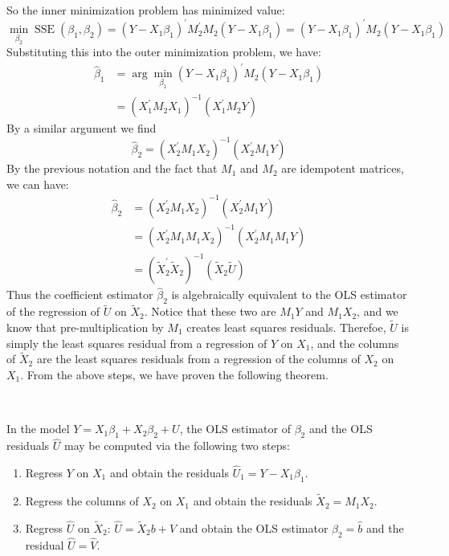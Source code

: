So the inner minimization problem has minimized value:
\[
\min_{\beta_2} \operatorname{SSE}(\beta_1, \beta_2)= (Y - X_1 \beta_1)^{\prime} M_2^{\prime} M_2 (Y - X_1 \beta_1) = (Y - X_1 \beta_1)^{\prime} M_2 (Y - X_1 \beta_1)
\]
Substituting this into the outer minimization problem, we have:
\begin{align*}
    \hat{\beta}_1 &= \arg \min_{\beta_1} (Y - X_1 \beta_1)^{\prime} M_2 (Y - X_1 \beta_1) \\
              &= \left( X_1^{\prime} M_2 X_1 \right)^{-1} \left( X_1^{\prime} M_2 Y \right)
\end{align*}
By a similar argument we find
\[
\hat{\beta}_2 = \left( X_2^{\prime} M_1 X_2 \right)^{-1} \left( X_2^{\prime} M_1 Y \right)
\]
By the previous notation and the fact that $M_1$ and $M_2$ are idempotent matrices, we can have:
\begin{align*}
    \hat{\beta}_2 &= \left( X_2^{\prime} M_1 X_2 \right)^{-1} \left( X_2^{\prime} M_1 Y \right) \\
              &= \left( X_2^{\prime} M_1 M_1 X_2 \right)^{-1}  \left( X_2^{\prime} M_1 M_1 Y \right) \\
              &= \left( \tilde{X}_2^{\prime} \tilde{X}_2 \right)^{-1} \left( \tilde{X}_2 \tilde{U} \right)
\end{align*}
Thus the coefficient estimator $\hat{\beta}_2$ is algebraically equivalent to the OLS estimator of the regression of $\tilde{U}$ on $\tilde{X}_2$.
Notice that these two are $M_1 Y$ and $M_1 X_2$, and we know that pre-multiplication by $M_1$ creates least squares residuals.
Therefoe, $\tilde{U}$ is simply the least squares residual from a regression of $Y$ on $X_1$,
and the columns of $\tilde{X}_2$ are the least squares residuals from a regression of the columns of $X_2$ on $X_1$.
From the above steps, we have proven the following theorem.

\begin{theorem}\label{thm:FWL}
    \

    In the model $Y = X_1 \beta_1 + X_2 \beta_2 + U$, the OLS estimator of $\beta_2$ and the OLS residuals $\hat{U}$ may be
    computed via the following two steps:
    \begin{enumerate}
        \item Regress $Y$ on $X_1$ and obtain the residuals $\hat{U}_1 = Y - X_1 \hat{\beta}_1$.
        \item Regress the columns of $X_2$ on $X_1$ and obtain the residuals $\tilde{X}_2 = M_1 X_2$.
        \item Regress $\hat{U}$ on $\tilde{X}_2$: $\hat{U} = \tilde{X}_2 b + V$ and obtain the OLS estimator $\hat{\beta}_2 = \hat{b}$ and the residual $\hat{U} = \hat{V}$.
    \end{enumerate}
\end{theorem}

